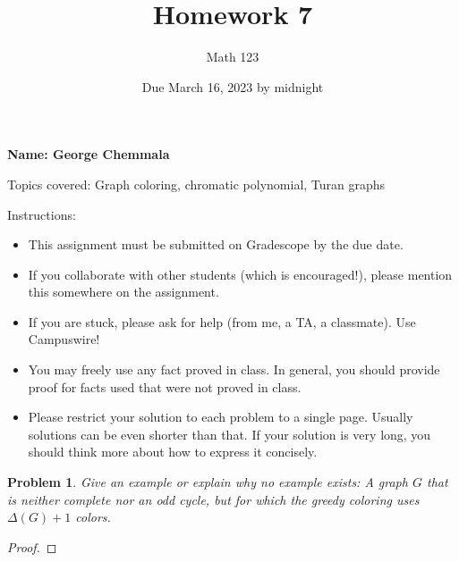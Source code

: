 \documentclass[11pt]{article}
\author{Math 123}
\date{Due March 16, 2023 by midnight}
\title{Homework 7}
\newtheorem{problem}{Problem}
\begin{document}
\maketitle

{\bf\Large Name: George Chemmala} 


\vspace{.3in}
Topics covered: Graph coloring, chromatic polynomial, Turan graphs

Instructions: 
\begin{itemize}
\item This assignment must be submitted on Gradescope by the due date. 
\item If you collaborate with other students (which is encouraged!), please mention this somewhere on the assignment. 
\item If you are stuck, please ask for help (from me, a TA, a classmate). Use Campuswire!  
\item You may freely use any fact proved in class. In general, you should provide proof for facts used that were not proved in class. 
\item Please restrict your solution to each problem to a single page. Usually solutions can be even shorter than that. If your solution is very long, you should think more about how to express it concisely.
\end{itemize}


\pagebreak 


\begin{problem}
Give an example or explain why no example exists: A graph $G$ that is neither complete nor an odd cycle, but for which the greedy coloring uses $\Delta(G)+1$ colors. 
\end{problem}

\begin{proof}

\end{proof}

\pagebreak
\end{document}
